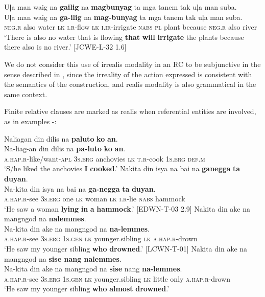 \ea
\label{bkm:Ref116914459}\label{bkm:Ref474761945}
Uļa  man  waig  na  \textbf{gailig}  na  \textbf{magbunyag}  ta  mga  tanem tak  uļa  man  suba. \smallskip\\
\gll Uļa  man  waig  na  \textbf{ga-ilig}  na  \textbf{mag-bunyag}  ta  mga  tanem tak  uļa  man  suba. \\
\textsc{neg.r}  also  water  \textsc{lk}  \textsc{i.r}-flow  \textsc{lk}  \textsc{i.ir}-irrigate  \textsc{nabs}  \textsc{pl}  plant
because  \textsc{neg.r}  also  river \\
\glt `There is also no water that is flowing \textbf{that} \textbf{will} \textbf{irrigate} the plants because there also is no river.’ [JCWE-L-32 1.6]
\z

We do not consider this use of irrealis modality in an RC to be subjunctive in the sense described in , since the irreality of the action expressed is consistent with the semantics of the construction, and realis modality is also grammatical in the same context.

Finite relative clauses are marked as realis when referential entities are involved, as in examples -:

\ea
\label{bkm:Ref474747019}
Naliagan  din  dilis  na  \textbf{paluto}  \textbf{ko}  \textbf{an}. \smallskip\\
\gll Na-liag-an  din  dilis  na  \textbf{pa-luto}  \textbf{ko}  \textbf{an}. \\
\textsc{a.hap.r}-like/want-\textsc{apl}  3\textsc{s.erg}  anchovies  \textsc{lk}  \textsc{t.r}-cook  1\textsc{s.erg}  \textsc{def.m} \\
\glt ‘S/he liked the anchovies \textbf{I} \textbf{cooked}.’
\z
\ea
\label{bkm:Ref474749882}
Nakita  din  isya  na  bai  na  \textbf{ganegga}  \textbf{ta}  \textbf{duyan}. \smallskip\\
\gll Na-kita  din  isya  na  bai  na  \textbf{ga-negga}  \textbf{ta}  \textbf{duyan}. \\
\textsc{a.hap.r}-see  3\textsc{s.erg}  one  \textsc{lk}  woman  \textsc{lk}  \textsc{i.r}-lie  \textsc{nabs}  hammock \\
\glt ‘He saw a woman \textbf{lying} \textbf{in} \textbf{a} \textbf{hammock}.’ [EDWN-T-03  2.9]
\z
\ea
Nakita  din  ake  na  mangngod  na  \textbf{nalemmes}. \smallskip\\
\gll Na-kita  din  ake  na  mangngod  na  \textbf{na-lemmes}. \\
\textsc{a.hap.r}-see  3\textsc{s.erg}  1\textsc{s.gen}  \textsc{lk}  younger.sibling  \textsc{lk}  \textsc{a.hap.r}-drown \\
\glt ‘He saw my younger sibling \textbf{who} \textbf{drowned}.’ [LCWN-T-01]
\z
\ea
\label{bkm:Ref474907453}
Nakita  din  ake  na  mangngod  na  \textbf{sise  nang  nalemmes}. \smallskip\\
\gll Na-kita  din  ake  na  mangngod  na  \textbf{sise} nang  \textbf{na-lemmes}. \\
\textsc{a.hap.r}-see  3\textsc{s.erg}  1\textsc{s.gen}  \textsc{lk}  younger.sibling  \textsc{lk}  little only \textsc{a.hap.r}-drown \\
\glt ‘He saw my younger sibling \textbf{who} \textbf{almost} \textbf{drowned}.’
\z

